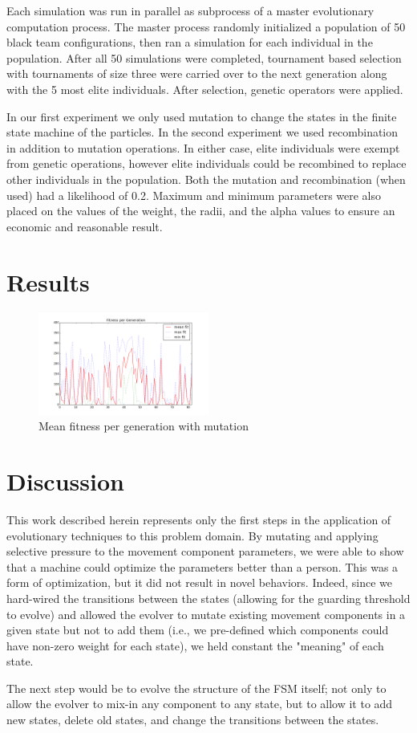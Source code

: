 \documentclass[12pt,journal,compsoc]{IEEEtran}
\begin{document}
Each simulation was run in parallel as subprocess of a master evolutionary computation process. The master process randomly initialized a population of 50 black team configurations, then ran a simulation for each individual in the population. After all 50 simulations were completed, tournament based selection with tournaments of size three were carried over to the next generation along with the 5 most elite individuals. After selection, genetic operators were applied.

In our first experiment we only used mutation to change the states in the finite state machine of the particles. In the second experiment we used recombination in addition to mutation operations. In either case, elite individuals were exempt from genetic operations, however elite individuals could be recombined to replace other individuals in the population. Both the mutation and recombination (when used) had a likelihood of 0.2. Maximum and minimum parameters were also placed on the values of the weight, the radii, and the alpha values to ensure an economic and reasonable result.

\section{Results}

\begin{figure}[h!]
    \centering
        \includegraphics[width=0.5\textwidth]{figures/meanfit_experiment1}
    \caption{Mean fitness per generation with mutation}
\end{figure}

\section{Discussion}
This work described herein represents only the first steps in the application of evolutionary techniques to this problem domain. By mutating and applying selective pressure to the movement component parameters, we were able to show that a machine could optimize the parameters better than a person. This was a form of optimization, but it did not result in novel behaviors. Indeed, since we hard-wired the transitions between the states (allowing for the guarding threshold to evolve) and allowed the evolver to mutate existing movement components in a given state but not to add them (i.e., we pre-defined which components could have non-zero weight for each state), we held constant the "meaning" of each state.

The next step would be to evolve the structure of the FSM itself; not only to allow the evolver to mix-in any component to any state, but to allow it to add new states, delete old states, and change the transitions between the states.



\end{document}
